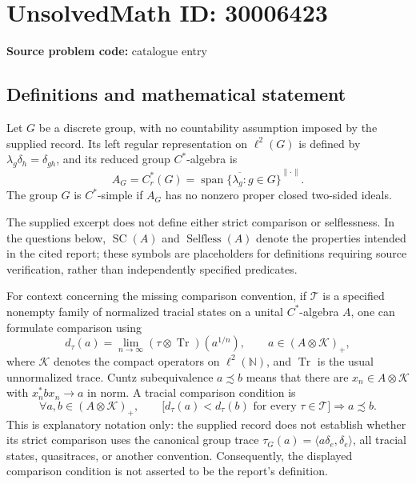 \documentclass[11pt]{article}
\newcommand{\N}{\mathbb{N}}
\begin{document}
\section*{UnsolvedMath ID: 30006423}
\textbf{Source problem code:} catalogue entry
\subsection{Definitions and mathematical statement}
Let \(G\) be a discrete group, with no countability assumption imposed by the supplied record. Its left regular representation on \(\ell^2(G)\) is defined by \(\lambda_g\delta_h=\delta_{gh}\), and its reduced group \(C^*\)-algebra is
\[
A_G=C_r^*(G)=\overline{\operatorname{span}\{\lambda_g:g\in G\}}^{\|\cdot\|}.
\]
The group \(G\) is \(C^*\)-simple if \(A_G\) has no nonzero proper closed two-sided ideals.

The supplied excerpt does not define either strict comparison or selflessness. In the questions below, \(\operatorname{SC}(A)\) and \(\operatorname{Selfless}(A)\) denote the properties intended in the cited report; these symbols are placeholders for definitions requiring source verification, rather than independently specified predicates.

For context concerning the missing comparison convention, if \(\mathcal T\) is a specified nonempty family of normalized tracial states on a unital \(C^*\)-algebra \(A\), one can formulate comparison using
\[
d_\tau(a)=\lim_{n\to\infty}(\tau\otimes\operatorname{Tr})(a^{1/n}),
\qquad a\in(A\otimes\mathcal K)_+,
\]
where \(\mathcal K\) denotes the compact operators on \(\ell^2(\N)\), and \(\operatorname{Tr}\) is the usual unnormalized trace. Cuntz subequivalence \(a\precsim b\) means that there are \(x_n\in A\otimes\mathcal K\) with \(x_n^*bx_n\to a\) in norm. A tracial comparison condition is
\[
\forall a,b\in(A\otimes\mathcal K)_+,\qquad
\bigl[d_\tau(a)<d_\tau(b)\text{ for every }\tau\in\mathcal T\bigr]
\Longrightarrow a\precsim b.
\]
This is explanatory notation only: the supplied record does not establish whether its strict comparison uses the canonical group trace \(\tau_G(a)=\langle a\delta_e,\delta_e\rangle\), all tracial states, quasitraces, or another convention. Consequently, the displayed comparison condition is not asserted to be the report's definition.
\end{document}
